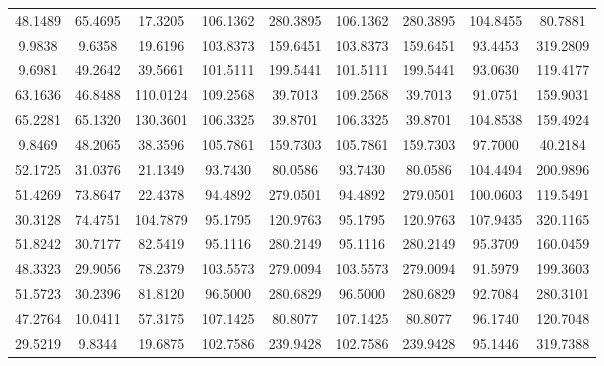 \documentclass[withoutpreface,bwprint]{cumcmthesis} %
\begin{document}
\begin{appendices}
\begin{table}[htbp!]
\begin{tabular}{@{}ccccccccc@{}}
							48.1489        & 65.4695        & 17.3205     & 106.1362    & 280.3895    & 106.1362        & 280.3895        & 104.8455        & 80.7881         \\
							9.9838         & 9.6358         & 19.6196     & 103.8373    & 159.6451    & 103.8373        & 159.6451        & 93.4453         & 319.2809        \\
							9.6981         & 49.2642        & 39.5661     & 101.5111    & 199.5441    & 101.5111        & 199.5441        & 93.0630         & 119.4177        \\
							63.1636        & 46.8488        & 110.0124    & 109.2568    & 39.7013     & 109.2568        & 39.7013         & 91.0751         & 159.9031        \\
							65.2281        & 65.1320        & 130.3601    & 106.3325    & 39.8701     & 106.3325        & 39.8701         & 104.8538        & 159.4924        \\
							9.8469         & 48.2065        & 38.3596     & 105.7861    & 159.7303    & 105.7861        & 159.7303        & 97.7000         & 40.2184         \\
							52.1725        & 31.0376        & 21.1349     & 93.7430     & 80.0586     & 93.7430         & 80.0586         & 104.4494        & 200.9896        \\
							51.4269        & 73.8647        & 22.4378     & 94.4892     & 279.0501    & 94.4892         & 279.0501        & 100.0603        & 119.5491        \\
							30.3128        & 74.4751        & 104.7879    & 95.1795     & 120.9763    & 95.1795         & 120.9763        & 107.9435        & 320.1165        \\
							51.8242        & 30.7177        & 82.5419     & 95.1116     & 280.2149    & 95.1116         & 280.2149        & 95.3709         & 160.0459        \\
							48.3323        & 29.9056        & 78.2379     & 103.5573    & 279.0094    & 103.5573        & 279.0094        & 91.5979         & 199.3603        \\
							51.5723        & 30.2396        & 81.8120     & 96.5000     & 280.6829    & 96.5000         & 280.6829        & 92.7084         & 280.3101        \\
							47.2764        & 10.0411        & 57.3175     & 107.1425    & 80.8077     & 107.1425        & 80.8077         & 96.1740         & 120.7048        \\
							29.5219        & 9.8344         & 19.6875     & 102.7586    & 239.9428    & 102.7586        & 239.9428        & 95.1446         & 319.7388        \\

\end{tabular}
\end{table}
\end{appendices}
\end{document}
